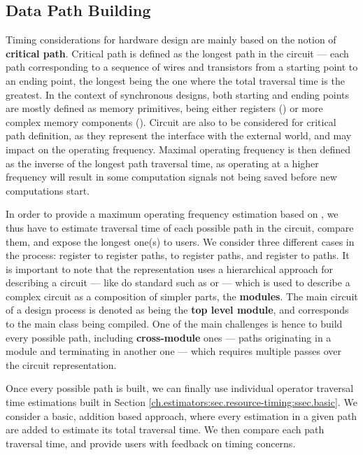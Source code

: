     \subsection{Data Path Building}
    \label{ch.estimators:sec.resource-timing:ssec.path}

        Timing considerations for hardware design are mainly based on the notion of {\bf critical path}.
        Critical path is defined as the longest path in the circuit --- each path corresponding to a sequence of wires and transistors from a starting point to an ending point, the longest being the one where the total traversal time is the greatest.
        In the context of synchronous designs, both starting and ending points are mostly defined as memory primitives, being either registers () or more complex memory components (\eg {}).
        Circuit  are also to be considered for critical path definition, as they represent the interface with the external world, and may impact on the operating frequency.
        Maximal operating frequency is then defined as the inverse of the longest path traversal time, as operating at a higher frequency will result in some computation signals not being saved before new computations start.

        In order to provide a maximum operating frequency estimation based on \firrtl{}, we thus have to estimate traversal time of each possible path in the circuit, compare them, and expose the longest one(s) to users. 
        We consider three different cases in the process: register to register paths,  to register paths, and register to  paths. 
        It is important to note that the \firrtl{} representation uses a hierarchical approach for describing a circuit --- like do standard  such as \verilog{} or \vhdl{} --- which is used to describe a complex circuit as a composition of simpler parts, the {\bf modules}.
        The main circuit of a design process is denoted as being the {\bf top level module}, and corresponds to the main \chisel{} class being compiled.
        One of the main challenges is hence to build every possible path, including {\bf cross-module} ones --- \ie paths originating in a module and terminating in another one --- which requires multiple passes over the circuit representation.

        Once every possible path is built, we can finally use individual operator traversal time estimations built in Section \ref{ch.estimators:sec.resource-timing:ssec.basic}.
        We consider a basic, addition based approach, where every estimation in a given path are added to estimate its total traversal time.
        We then compare each path traversal time, and provide users with feedback on timing concerns.

